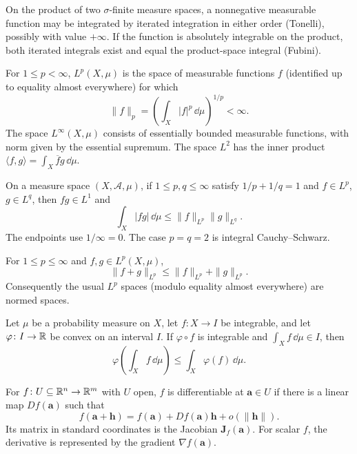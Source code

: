 \begin{theorem}
On the product of two $\sigma$-finite measure spaces, a nonnegative measurable function may be integrated by iterated integration in either order (Tonelli), possibly with value $+\infty$. If the function is absolutely integrable on the product, both iterated integrals exist and equal the product-space integral (Fubini).
\end{theorem}

\begin{definition}
For $1\le p<\infty$, $L^p(X,\mu)$ is the space of measurable functions $f$ (identified up to equality almost everywhere) for which
\[
 \|f\|_p=\left(\int_X|f|^p\,\dd\mu\right)^{1/p}<\infty.
\]
The space $L^\infty(X,\mu)$ consists of essentially bounded measurable functions, with norm given by the essential supremum. The space $L^2$ has the inner product $\langle f,g\rangle=\int_X\overline f g\,\dd\mu$.
\end{definition}

\begin{theorem}
On a measure space $(X,\mathcal{A},\mu)$, if $1\le p,q\le\infty$ satisfy $1/p+1/q=1$ and $f\in L^p$, $g\in L^q$, then $fg\in L^1$ and
\[
 \int_X |fg|\,\dd\mu\le\|f\|_{L^p}\|g\|_{L^q}.
\]
The endpoints use $1/\infty=0$. The case $p=q=2$ is integral Cauchy--Schwarz.
\end{theorem}

\begin{theorem}
For $1\le p\le\infty$ and $f,g\in L^p(X,\mu)$,
\[
 \|f+g\|_{L^p}\le\|f\|_{L^p}+\|g\|_{L^p}.
\]
Consequently the usual $L^p$ spaces (modulo equality almost everywhere) are normed spaces.
\end{theorem}

\begin{theorem}
Let $\mu$ be a probability measure on $X$, let $f\colon X\to I$ be integrable, and let $\varphi\colon I\to\mathbb{R}$ be convex on an interval $I$. If $\varphi\circ f$ is integrable and $\int_X f\,\dd\mu\in I$, then
\[
 \varphi\!\left(\int_Xf\,\dd\mu\right)\le\int_X\varphi(f)\,\dd\mu.
\]
\end{theorem}

\begin{definition}
For $f\colon U\subseteq\mathbb{R}^n\to\mathbb{R}^m$ with $U$ open, $f$ is differentiable at $\mathbf{a}\in U$ if there is a linear map $Df(\mathbf{a})$ such that
\[
 f(\mathbf{a}+\mathbf{h})=f(\mathbf{a})+Df(\mathbf{a})\mathbf{h}+o(\|\mathbf{h}\|).
\]
Its matrix in standard coordinates is the Jacobian $\mathbf{J}_f(\mathbf{a})$. For scalar $f$, the derivative is represented by the gradient $\nabla f(\mathbf{a})$.
\end{definition}

